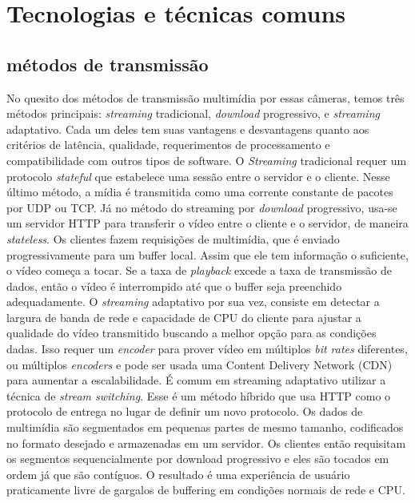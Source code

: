 \documentclass[12pt, %
openright, 
oneside, %
a4paper,    %
brazil]{facom-ufu-abntex2}
\begin{document}
\section{Tecnologias e técnicas comuns}

\subsection{métodos de transmissão}

No quesito dos métodos de transmissão multimídia por essas câmeras, temos três
métodos principais: \textit{\foreignlanguage{english}{streaming}} tradicional,
\textit{\foreignlanguage{english}{download}} progressivo, e
\textit{\foreignlanguage{english}{streaming}} adaptativo. Cada um deles tem
suas vantagens e desvantagens quanto aos critérios de latência, qualidade,
requerimentos de processamento e compatibilidade com outros tipos de software.
O \textit{\foreignlanguage{english}{Streaming}} tradicional requer um protocolo
\textit{\foreignlanguage{english}{stateful}} que estabelece uma sessão entre o
servidor e o cliente. Nesse último método, a mídia é transmitida como uma
corrente constante de pacotes por UDP ou TCP.
Já no método do streaming por \textit{\foreignlanguage{english}{download}}
progressivo, usa-se um servidor HTTP para transferir o vídeo entre o cliente e
o servidor, de maneira \textit{\foreignlanguage{english}{stateless}}. Os
clientes fazem requisições de multimídia, que é enviado progressivamente para
um buffer local. Assim que ele tem informação o suficiente, o vídeo começa a
tocar. Se a taxa de \textit{\foreignlanguage{english}{playback}} excede a taxa
de transmissão de dados, então o vídeo é interrompido até que o buffer seja
preenchido adequadamente. O \textit{\foreignlanguage{english}{streaming}}
adaptativo por sua vez, consiste em detectar a largura de banda de rede e
capacidade de CPU do cliente para ajustar a qualidade do vídeo transmitido
buscando a melhor opção para as condições dadas. Isso requer um
\textit{\foreignlanguage{english}{encoder}} para prover vídeo em múltiplos
\textit{\foreignlanguage{english}{bit rates}} diferentes, ou múltiplos
\textit{\foreignlanguage{english}{encoders}} e pode ser usada uma Content
Delivery Network (CDN) para aumentar a escalabilidade. É comum em streaming
adaptativo utilizar a técnica de \textit{\foreignlanguage{english}{stream
		switching}}. Esse é um método híbrido que usa HTTP como o protocolo de entrega
no lugar de definir um novo protocolo. Os dados de multimídia são segmentados
em pequenas partes de mesmo tamanho, codificados no formato desejado e
armazenadas em um servidor. Os clientes então requisitam os segmentos
sequencialmente por download progressivo e eles são tocados em ordem já que são
contíguos. O resultado é uma experiência de usuário praticamente livre de
gargalos de buffering em condições normais de rede e CPU.
\end{document}
